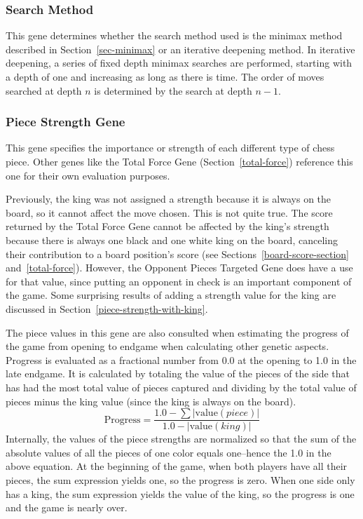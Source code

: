 \documentclass[letterpaper]{article}
\renewcommand{\_}{\allowbreak\textunderscore\allowbreak}
\begin{document}
\subsubsection{Search Method}
This gene determines whether the search method used is the minimax method described in Section~\ref{sec-minimax} or an iterative deepening method. In iterative deepening, a series of fixed depth minimax searches are performed, starting with a depth of one and increasing as long as there is time. The order of moves searched at depth \(n\) is determined by the search at depth \(n-1\).

\subsubsection{Piece Strength Gene}\label{piece-strength}
This gene specifies the importance or strength of each different type of chess piece. Other genes like the Total Force Gene (Section~\ref{total-force}) reference this one for their own evaluation purposes.

Previously, the king was not assigned a strength because it is always on the board, so it cannot affect the move chosen. This is not quite true. The score returned by the Total Force Gene cannot be affected by the king's strength because there is always one black and one white king on the board, canceling their contribution to a board position's score (see Sections~\ref{board-score-section} and~\ref{total-force}). However, the Opponent Pieces Targeted Gene does have a use for that value, since putting an opponent in check is an important component of the game. Some surprising results of adding a strength value for the king are discussed in Section~\ref{piece-strength-with-king}.

The piece values in this gene are also consulted when estimating the progress of the game from opening to endgame when calculating other genetic aspects. Progress is evaluated as a fractional number from 0.0 at the opening to 1.0 in the late endgame. It is calculated by totaling the value of the pieces of the side that has had the most total value of pieces captured and dividing by the total value of pieces minus the king value (since the king is always on the board).
\[
\textrm{Progress} = \frac{1.0 - \sum |\textrm{value}(piece)|}{1.0 - |\textrm{value}(king)|}
\]
Internally, the values of the piece strengths are normalized so that the sum of the absolute values of all the pieces of one color equals one--hence the 1.0 in the above equation. At the beginning of the game, when both players have all their pieces, the sum expression yields one, so the progress is zero. When one side only has a king, the sum expression yields the value of the king, so the progress is one and the game is nearly over.
\end{document}

